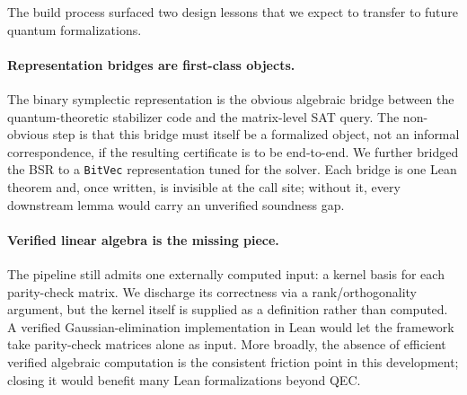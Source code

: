 %
%
%
%
%

The build process surfaced two design lessons that we expect to transfer to
future quantum formalizations.

\paragraph{Representation bridges are first-class objects.} The binary
symplectic representation is the obvious algebraic bridge between the
quantum-theoretic stabilizer code and the matrix-level SAT query. The
non-obvious step is that this bridge must itself be a formalized object, not an
informal correspondence, if the resulting certificate is to be end-to-end. We
further bridged the BSR to a \lstinline{BitVec} representation tuned for the
solver. Each bridge is one Lean theorem and, once written, is invisible at the
call site; without it, every downstream lemma would carry an unverified
soundness gap.

\paragraph{Verified linear algebra is the missing piece.} The pipeline still
admits one externally computed input: a kernel basis for each parity-check
matrix. We discharge its correctness via a rank/orthogonality argument, but the
kernel itself is supplied as a definition rather than computed. A verified
Gaussian-elimination implementation in Lean would let the framework take
parity-check matrices alone as input. More broadly, the absence of efficient
verified algebraic computation is the consistent friction point in this
development; closing it would benefit many Lean formalizations beyond QEC.

